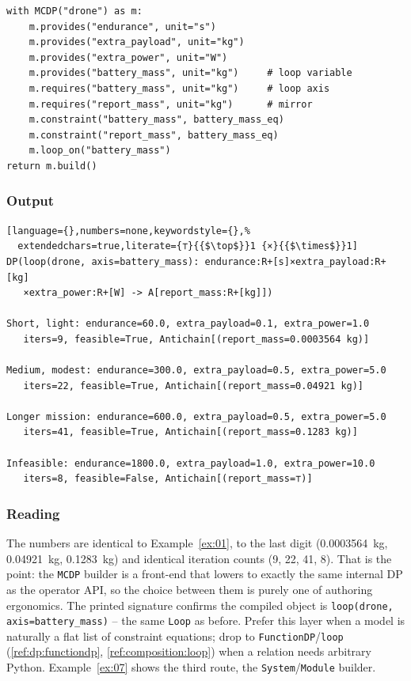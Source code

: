 \documentclass[11pt,a4paper]{article}
\begin{document}
\begin{lstlisting}
with MCDP("drone") as m:
    m.provides("endurance", unit="s")
    m.provides("extra_payload", unit="kg")
    m.provides("extra_power", unit="W")
    m.provides("battery_mass", unit="kg")     # loop variable
    m.requires("battery_mass", unit="kg")     # loop axis
    m.requires("report_mass", unit="kg")      # mirror
    m.constraint("battery_mass", battery_mass_eq)
    m.constraint("report_mass", battery_mass_eq)
    m.loop_on("battery_mass")
return m.build()
\end{lstlisting}

\subsubsection*{Output}

\begin{lstlisting}[language={},numbers=none,keywordstyle={},%
  extendedchars=true,literate={⊤}{{$\top$}}1 {×}{{$\times$}}1]
DP(loop(drone, axis=battery_mass): endurance:R+[s]×extra_payload:R+[kg]
   ×extra_power:R+[W] -> A[report_mass:R+[kg]])

Short, light: endurance=60.0, extra_payload=0.1, extra_power=1.0
   iters=9, feasible=True, Antichain[(report_mass=0.0003564 kg)]

Medium, modest: endurance=300.0, extra_payload=0.5, extra_power=5.0
   iters=22, feasible=True, Antichain[(report_mass=0.04921 kg)]

Longer mission: endurance=600.0, extra_payload=0.5, extra_power=5.0
   iters=41, feasible=True, Antichain[(report_mass=0.1283 kg)]

Infeasible: endurance=1800.0, extra_payload=1.0, extra_power=10.0
   iters=8, feasible=False, Antichain[(report_mass=⊤)]
\end{lstlisting}

\subsubsection*{Reading}

The numbers are identical to Example~\ref{ex:01}, to the last digit
(0.0003564~kg, 0.04921~kg, 0.1283~kg) and identical iteration counts
(9, 22, 41, 8). That is the point: the \texttt{MCDP} builder is a
front-end that lowers to exactly the same internal DP as the operator API,
so the choice between them is purely one of authoring ergonomics. The
printed signature confirms the compiled object is
\texttt{loop(drone, axis=battery\_mass)} -- the same \texttt{Loop} as
before. Prefer this layer when a model is naturally a flat list of
constraint equations; drop to \texttt{FunctionDP}/\texttt{loop}
(\ref{ref:dp:functiondp}, \ref{ref:composition:loop}) when a relation
needs arbitrary Python. Example~\ref{ex:07} shows the third route, the
\texttt{System}/\texttt{Module} builder.
\end{document}
